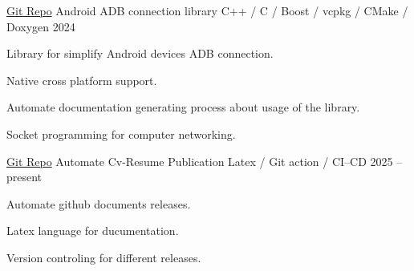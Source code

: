 \begin{cventries}
  \cventry
    {\href{https://github.com/drsamitha/adbLib}{Git Repo}} %
    {Android ADB connection library} %
    {C++ / C / Boost / vcpkg / CMake / Doxygen} %
    {2024} %
    {
      \begin{cvitems} %
        \item {Library for simplify Android devices ADB connection.}
        \item {Native cross platform support.}
        \item {Automate documentation generating process about usage of the library.}
        \item {Socket programming for computer networking.}
      \end{cvitems}
    }
    
  \cventry
    {\href{https://github.com/drsamitha/Awesome-CV}{Git Repo}} %
    {Automate Cv-Resume Publication} %
    {Latex / Git action / CI--CD} %
    {2025 -- present} %
    {
      \begin{cvitems} %
        \item {Automate github documents releases.}
        \item {Latex language for ducumentation.}
        \item {Version controling for different releases.}
      \end{cvitems}
    }


\end{cventries}
